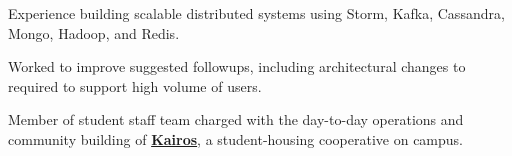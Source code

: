 \documentclass[letterpaper]{deedy-resume} %
\begin{document}
\begin{minipage}[t]{0.66\textwidth}


\begin{tightitemize}
\item Experience building scalable distributed systems using Storm, Kafka, Cassandra, Mongo, Hadoop, and Redis.

\item Worked to improve suggested followups, including architectural changes to required to support high volume of users.
\end{tightitemize}

\sectionspace %



\begin{tightitemize}
\item Member of student staff team charged with the day-to-day operations and community building of \textbf{\href{http://web.stanford.edu/group/kairos/}{Kairos}}, a student-housing cooperative on campus.


\end{tightitemize}








\end{minipage}
\end{document}

